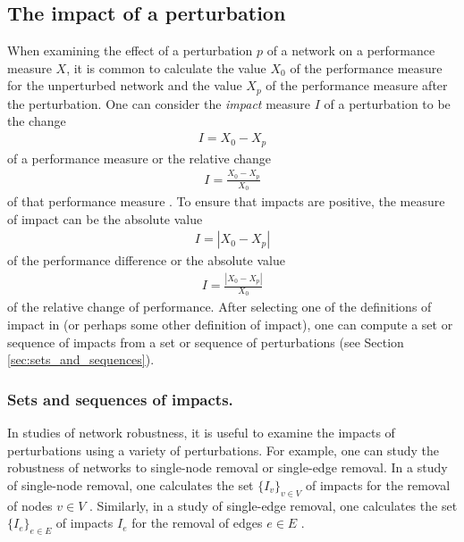 \documentclass{comnet-mod}
\begin{document}
\subsection{The impact of a perturbation}\label{sec:impact}

When examining the effect of a perturbation $p$ of a network on a performance measure $X$, it is common to calculate the value $X_0$ of the performance measure for the unperturbed network and the value $X_p$ of the performance measure after the perturbation. One can consider the \textit{impact} measure $I$ of a perturbation to be the change
\begin{align} \label{eq:impact_as_change}
	I = X_0 - X_p
\end{align}
of a performance measure or the relative change
\begin{align} \label{eq:impact_as_relative_change}
    I = \frac{X_0 - X_p}{X_0} 
\end{align}
of that performance measure \cite{Albert2004, Latora2005, Nagurney2007, Behre2008, Dattilo2016, Lance2017, Liu2017}. To ensure that impacts are positive, the measure of impact can be the absolute value 
\begin{align} \label{eq:impact_as_abs_change}
    I = |X_0 - X_p|
\end{align}
of the performance difference or the absolute value 
\begin{align} \label{eq:impact_as_abs_relative_change}
    I = \frac{|X_0 - X_p|}{X_0}
\end{align}
of the relative change of performance.
After selecting one of the definitions of impact in  (or perhaps some other definition of impact), one can compute a set or sequence of impacts from a set or sequence of perturbations (see Section \ref{sec:sets_and_sequences}).


\subsubsection{Sets and sequences of impacts.}\label{sec:impact_sets}

In studies of network robustness, it is useful to examine the impacts of perturbations using a variety of perturbations. For example, one can study the robustness of networks to single-node removal or single-edge removal. In a study of single-node removal, one calculates the set $\{I_v\}_{v\in V}$ of impacts for the removal of nodes $v \in V$ \cite{Wilhelm2004, Wang2014, Tang2016}. Similarly, in a study of single-edge removal, one calculates the set $\{I_e\}_{e\in E}$ of impacts $I_{e}$ for the removal of edges $e \in E$ \cite{Latora2005}.
\end{document}
